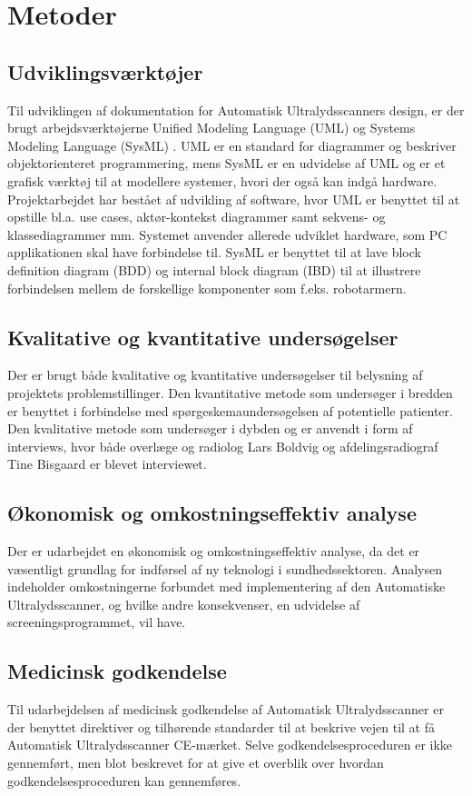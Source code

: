 \chapter{Metoder}\label{Metoder}

\section{Udviklingsværktøjer} 
Til udviklingen af dokumentation for Automatisk Ultralydsscanners design, er der brugt arbejdsværktøjerne Unified Modeling Language (UML) \cite{UML} og Systems Modeling Language (SysML) \cite{SysML}. UML er en standard for diagrammer og beskriver objektorienteret programmering, mens SysML er en udvidelse af UML og er et grafisk værktøj til at modellere systemer, hvori der også kan indgå hardware. Projektarbejdet har bestået af udvikling af software, hvor  UML er benyttet til at opstille bl.a. use cases, aktør-kontekst diagrammer samt sekvens- og klassediagrammer mm. Systemet anvender allerede udviklet hardware, som PC applikationen skal have forbindelse til. SysML er benyttet til at lave block definition diagram (BDD) og internal block diagram (IBD) til at illustrere forbindelsen mellem de forskellige komponenter som f.eks. robotarmern.

\section{Kvalitative og kvantitative undersøgelser}
Der er brugt både kvalitative og kvantitative undersøgelser til belysning af projektets problemstillinger. Den kvantitative metode som undersøger i bredden er benyttet i forbindelse med spørgeskemaundersøgelsen af potentielle patienter. Den kvalitative metode som undersøger i dybden og er anvendt i form af interviews, hvor både overlæge og radiolog Lars Boldvig og afdelingsradiograf Tine Bisgaard er blevet interviewet. 

\section{Økonomisk og omkostningseffektiv analyse}
Der er udarbejdet en økonomisk og omkostningseffektiv analyse, da det er væsentligt grundlag for indførsel af ny teknologi i sundhedssektoren. Analysen indeholder omkostningerne forbundet med implementering af den Automatiske Ultralydsscanner, og hvilke andre konsekvenser, en udvidelse af screeningsprogrammet, vil have. 

\section{Medicinsk godkendelse}
Til udarbejdelsen af medicinsk godkendelse af Automatisk Ultralydsscanner er der benyttet direktiver og tilhørende standarder til at beskrive vejen til at få Automatisk Ultralydsscanner CE-mærket. Selve godkendelsesproceduren er ikke gennemført, men blot beskrevet for at give et overblik over hvordan godkendelsesproceduren kan gennemføres. 